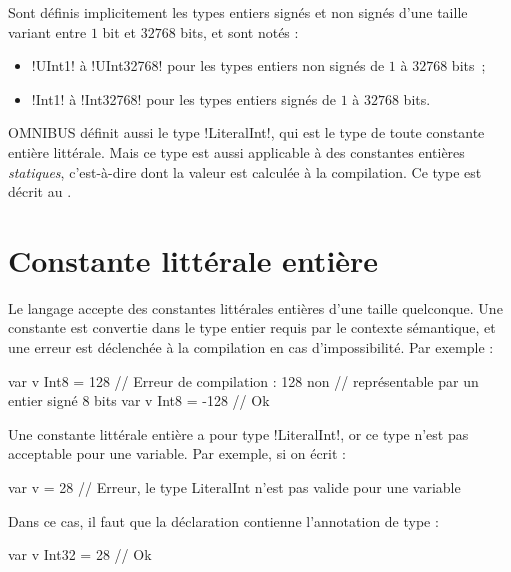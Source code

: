 





Sont définis implicitement les types entiers signés et non signés d'une taille variant entre $1$ bit et $32768$ bits, et sont notés :
\begin{itemize}
  \item \omnibus!UInt1! à \omnibus!UInt32768! pour les types entiers non signés de $1$ à $32768$ bits~;
  \item \omnibus!Int1! à \omnibus!Int32768! pour les types entiers signés de $1$ à $32768$ bits.
\end{itemize}

OMNIBUS définit aussi le type \omnibus!LiteralInt!, qui est le type de toute constante entière littérale. Mais ce type est aussi applicable à des constantes entières \emph{statiques}, c'est-à-dire dont la valeur est calculée à la compilation. Ce type est décrit au .

\section{Constante littérale entière}

Le langage accepte des constantes littérales entières d'une taille quelconque. Une constante est convertie dans le type entier requis par le contexte sémantique, et une erreur est déclenchée à la compilation en cas d'impossibilité. Par exemple :

\begin{OMNIBUS}
var v Int8 = 128  // Erreur de compilation : 128 non
                   // représentable par un entier signé 8 bits
var v Int8 = -128 // Ok
\end{OMNIBUS}

Une constante littérale entière a pour type \omnibus!LiteralInt!, or ce type n'est pas acceptable pour une variable. Par exemple, si on écrit :
\begin{OMNIBUS}
var v = 28 // Erreur, le type LiteralInt n'est pas valide pour une variable
\end{OMNIBUS}

Dans ce cas, il faut que la déclaration contienne l'annotation de type :
\begin{OMNIBUS}
var v Int32 = 28 // Ok
\end{OMNIBUS}




